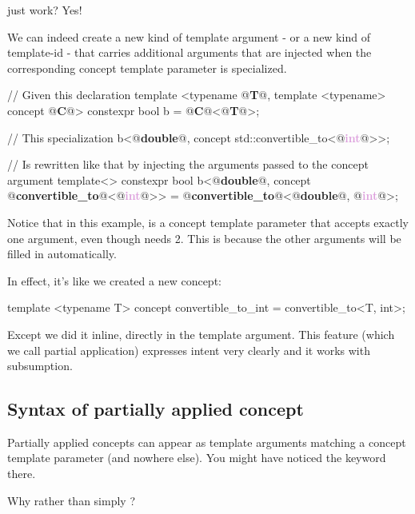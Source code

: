 \documentclass{wg21}
\begin{document}
just work? Yes!

We can indeed create a new kind of template argument - or a new kind of template-id - that carries additional arguments that are injected
when the corresponding concept template parameter is specialized.
\begin{colorblock}
// Given this declaration
template <typename @\textbf{\textcolor{OliveGreen}{T}}@, template <typename> concept @\textbf{\textcolor{WildStrawberry}{C}}@>
constexpr bool b = @\textbf{\textcolor{WildStrawberry}{C}}@<@\textbf{\textcolor{OliveGreen}{T}}@>;

// This specialization
b<@\textbf{\textcolor{OliveGreen}{double}}@, concept std::convertible_to<@\textbf{\textcolor{Plum}{int}}@>>;

// Is rewritten like that by injecting the arguments passed to the concept argument
template<>
constexpr bool b<@\textbf{\textcolor{OliveGreen}{double}}@, concept @\textbf{\textcolor{WildStrawberry}{convertible_to}}@<@\textbf{\textcolor{Plum}{int}}@>> = @\textbf{\textcolor{WildStrawberry}{convertible_to}}@<@\textbf{\textcolor{OliveGreen}{double}}@, @\textbf{\textcolor{Plum}{int}}@>;
\end{colorblock}

Notice that in this example,  is a concept template parameter that accepts exactly one argument,
even though  needs 2.
This is because the other arguments will be filled in automatically.

In effect, it's like we created a new concept:

\begin{colorblock}
template <typename T>
concept convertible_to_int = convertible_to<T, int>;
\end{colorblock}

Except we did it inline, directly in the template argument.
This feature (which we call partial application) expresses intent very clearly and it works with subsumption.

\subsection{Syntax of partially applied concept}

Partially applied concepts can appear as template arguments matching a concept template parameter (and nowhere else).
You might have noticed the  keyword there.

Why  rather than simply ?
\end{document}
